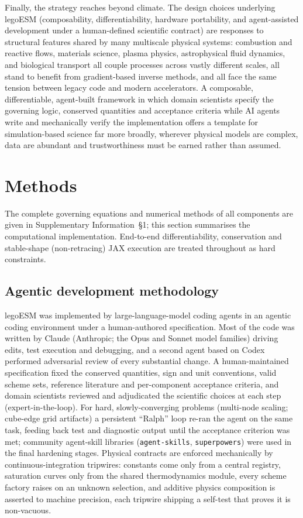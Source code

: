 \documentclass[11pt]{article}
\begin{document}
Finally, the strategy reaches beyond climate. The design choices underlying legoESM
(composability, differentiability, hardware portability, and agent-assisted development under a
human-defined scientific contract) are responses to structural features shared by many
multiscale physical systems: combustion and reactive flows, materials science, plasma physics,
astrophysical fluid dynamics, and biological transport all couple processes across vastly
different scales, all stand to benefit from gradient-based inverse methods, and all face the
same tension between legacy code and modern accelerators. A composable, differentiable,
agent-built framework in which domain scientists specify the governing logic, conserved
quantities and acceptance criteria while AI agents write and mechanically verify the
implementation offers a template for simulation-based science far more broadly, wherever
physical models are complex, data are abundant and trustworthiness must be earned rather than
assumed.

\section*{Methods}
\small
The complete governing equations and numerical methods of all components are given in
Supplementary Information~\S1; this section summarises the computational implementation.
End-to-end differentiability, conservation and stable-shape (non-retracing) JAX execution are
treated throughout as hard constraints.

\subsection*{Agentic development methodology}
legoESM was implemented by large-language-model coding agents in an agentic coding environment
under a human-authored specification. Most of the code was written by Claude (Anthropic; the Opus
and Sonnet model families) driving edits, test execution and debugging, and a second agent based
on Codex performed adversarial review of every substantial change. A human-maintained
specification fixed the conserved quantities, sign and unit conventions, valid scheme sets,
reference literature and per-component acceptance criteria, and domain scientists reviewed and
adjudicated the scientific choices at each step (expert-in-the-loop). For hard,
slowly-converging problems (multi-node scaling; cube-edge grid artifacts) a persistent ``Ralph''
loop re-ran the agent on the same task, feeding back test and diagnostic output until the
acceptance criterion was met; community agent-skill libraries (\texttt{agent-skills},
\texttt{superpowers}) were used in the final hardening stages. Physical contracts are enforced
mechanically by continuous-integration tripwires: constants come only from a central registry,
saturation curves only from the shared thermodynamics module, every scheme factory raises on an
unknown selection, and additive physics composition is asserted to machine precision, each
tripwire shipping a self-test that proves it is non-vacuous.
\end{document}
